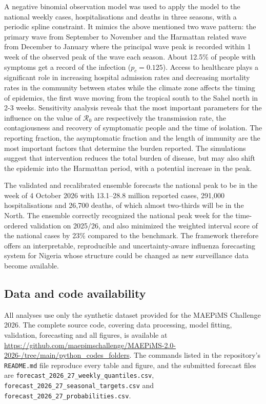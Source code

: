 \documentclass[12pt,a4paper]{article}
\theoremstyle{definition}
\theoremstyle{remark}
\begin{document}
A negative binomial observation model was used to apply the model to the national weekly cases, hospitalisations and deaths in three seasons, with a periodic spline constraint. It mimics the above mentioned two wave pattern: the primary wave from September to November and the Harmattan related wave from December to January where the principal wave peak is recorded within 1 week of the observed peak of the wave each season. About 12.5\% of people with symptoms get a record of the infection ($p_c = 0.125$). Access to healthcare plays a significant role in increasing hospital admission rates and decreasing mortality rates in the community between states while the climate zone affects the timing of epidemics, the first wave moving from the tropical south to the Sahel north in 2-3 weeks. Sensitivity analysis reveals that the most important parameters for the influence on the value of $\mathcal{R}_0$ are respectively the transmission rate, the contagiousness and recovery of symptomatic people and the time of isolation. The reporting fraction, the asymptomatic fraction and the length of immunity are the most important factors that determine the burden reported. The simulations suggest that intervention reduces the total burden of disease, but may also shift the epidemic into the Harmattan period, with a potential increase in the peak.

The validated and recalibrated ensemble forecasts the national peak to be in the week of 4 October 2026 with 13.1--28.8 million reported cases, 291{,}000 hospitalisations and 26{,}700 deaths, of which almost two-thirds will be in the North. The ensemble correctly recognized the national peak week for the time-ordered validation on 2025/26, and also minimized the weighted interval score of the national cases by 23\% compared to the benchmark. The framework therefore offers an interpretable, reproducible and uncertainty-aware influenza forecasting system for Nigeria whose structure could be changed as new surveillance data become available.

\subsection*{Data and code availability}

{\sloppy
All analyses use only the synthetic dataset provided for the MAEPiMS Challenge 2026. The complete source code, covering data processing, model fitting, validation, forecasting and all figures, is available at
\url{https://github.com/maepimschallenge/MAEPiMS-2.0-2026-/tree/main/python_codes_folders}.
The commands listed in the repository's \texttt{README.md} file reproduce every table and figure, and the submitted forecast files are \texttt{forecast\_2026\_27\_weekly\_quantiles.csv}, \texttt{forecast\_2026\_27\_seasonal\_targets.csv} and \texttt{forecast\_2026\_27\_probabilities.csv}.
\par}
\end{document}
